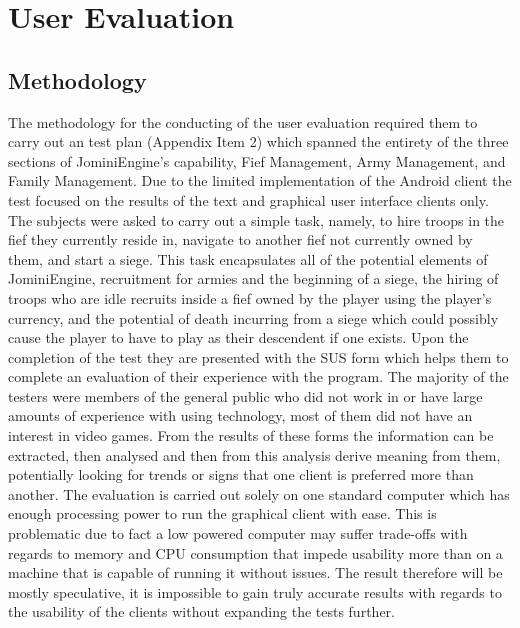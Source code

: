 \documentclass{article}
\begin{document}
\section{User Evaluation}
\subsection{Methodology}
The methodology for the conducting of the user evaluation required them to carry out an test plan (Appendix Item 2) which spanned the entirety of the three sections of JominiEngine’s capability, Fief Management, Army Management, and Family Management. Due to the limited implementation of the Android client the test focused on the results of the text and graphical user interface clients only. The subjects were asked to carry out a simple task, namely, to hire troops in the fief they currently reside in, navigate to another fief not currently owned by them, and start a siege. This task encapsulates all of the potential elements of JominiEngine, recruitment for armies and the beginning of a siege, the hiring of troops who are idle recruits inside a fief owned by the player using the player’s currency, and the potential of death incurring from a siege which could possibly cause the player to have to play as their descendent if one exists. Upon the completion of the test they are presented with the SUS form which helps them to complete an evaluation of their experience with the program. The majority of the testers were members of the general public who did not work in or have large amounts of experience with using technology, most of them did not have an interest in video games. From the results of these forms the information can be extracted, then analysed and then from this analysis derive meaning from them, potentially looking for trends or signs that one client is preferred more than another. The evaluation is carried out solely on one standard computer which has enough processing power to run the graphical client with ease. This is problematic due to fact a low powered computer may suffer trade-offs with regards to memory and CPU consumption that impede usability more than on a machine that is capable of running it without issues. The result therefore will be mostly speculative, it is impossible to gain truly accurate results with regards to the usability of the clients without expanding the tests further.
\end{document}

